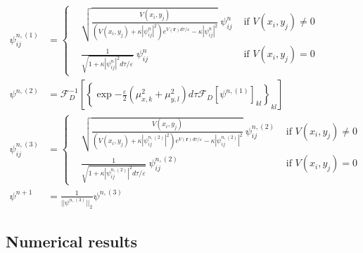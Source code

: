 \documentclass{article}
\begin{document}
$$
\begin{aligned}
\psi^{n,(1)}_{ij} & =\left\{
    \begin{aligned}
        & \sqrt{\frac{V(x_i,y_j)}{(V(x_i,y_j)+\kappa |\psi^n_{ij}|^2)e^{V(\mathbf{r})d\tau/\varepsilon}-\kappa |\psi^n_{ij}|^2}}~\psi^n_{ij} & \text{   if } V(x_i,y_j)\neq 0 \\
        & \frac{1}{\sqrt{1+\kappa |\psi^n_{ij}|^2 d\tau/\varepsilon}}~\psi^n_{ij} & \text{   if } V(x_i,y_j)= 0
    \end{aligned}
\right. \\
\psi^{n,(2)} & =\mathcal{F}_D^{-1}\left[\left\{\exp{-\frac{\varepsilon}{2}\left(\mu_{x,k}^2+\mu_{y,l}^2\right)d\tau}\mathcal{F}_D\left[\psi^{n,(1)}\right]_{kl}\right\}_{kl}\right] \\
\psi^{n,(3)}_{ij} & =\left\{
    \begin{aligned}
        & \sqrt{\frac{V(x_i,y_j)}{(V(x_i,y_j)+\kappa |\psi^{n,(2)}_{ij}|^2)e^{V(\mathbf{r})d\tau/\varepsilon}-\kappa |\psi^{n,(2)}_{ij}|^2}}~\psi^{n,(2)}_{ij} & \text{   if } V(x_i,y_j)\neq 0 \\
        & \frac{1}{\sqrt{1+\kappa |\psi^{n,(2)}_{ij}|^2 d\tau/\varepsilon}}~\psi^{n,(2)}_{ij} & \text{   if } V(x_i,y_j)= 0
    \end{aligned}
\right.\\
\psi^{n+1} & =\frac{1}{||\psi^{n,(3)}||_2}\psi^{n,(3)}
\end{aligned}
$$


\subsection{Numerical results}
\end{document}
